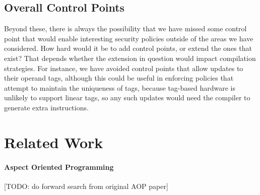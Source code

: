 \documentclass{llncs}
\begin{document}
\subsection{Overall Control Points}

Beyond these, there is always the possibility that we have missed some control point
that would enable interesting security policies outside of the areas we have considered.
How hard would it be to add control points, or extend the ones that exist? That depends
whether the extension in question would impact compilation strategies. For instance,
we have avoided control points that allow updates to their operand tags, although
this could be useful in enforcing policies that attempt to maintain the uniqueness of tags,
because tag-based hardware is unlikely to support linear tags, so any such updates would
need the compiler to generate extra instructions.

\section{Related Work}
\label{sec:related}


\paragraph{Aspect Oriented Programming}
[TODO: do forward search from original AOP paper]



\end{document}
